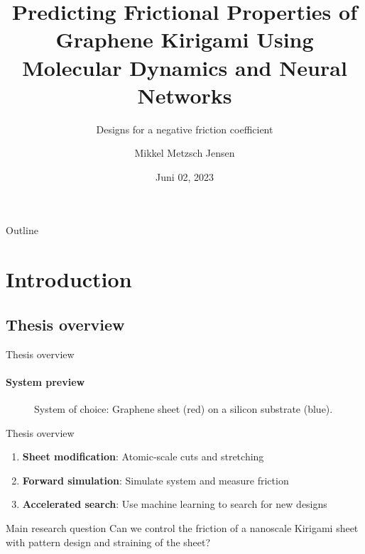 \documentclass[
	10pt, %
]{beamer}
\title[Predicting Graphene Kirigami Friction]{Predicting Frictional Properties of Graphene Kirigami Using Molecular Dynamics and Neural Networks}
\subtitle{Designs for a negative friction coefficient}
\author[Mikkel Metzsch Jensen]{Mikkel Metzsch Jensen}
\institute[UiO]{University of Oslo}
\date[Juni 02, 2023]{Juni 02, 2023}
\begin{document}

\begin{frame}
	\titlepage %
\end{frame}


\begin{frame}{Outline}
    \tableofcontents
\end{frame}
%
%
\section{Introduction} %
\subsection{Thesis overview}
\begin{frame}{Thesis overview}
	\framesubtitle{System preview}
	\begin{figure}
		\centering    
		\caption{System of choice: Graphene sheet (red) on a silicon substrate (blue).}
	\end{figure} 
\end{frame}
%
%
\begin{frame}{Thesis overview}
	\begin{enumerate}
		\setlength\itemsep{1em}
		\item \textbf{Sheet modification}: Atomic-scale cuts and stretching
		\item \textbf{Forward simulation}: Simulate system and measure friction
		\item \textbf{Accelerated search}: Use machine learning to search for new designs
	\end{enumerate}
	\vspace{2mm}
	\begin{center}
		\begin{minipage}{0.7\textwidth}
			\begin{block}{Main research question}
				Can we control the friction of a nanoscale Kirigami sheet with pattern design and straining of the sheet?
			\end{block}	
		\end{minipage}
	\end{center}

\end{frame}
%
%
\end{document}
